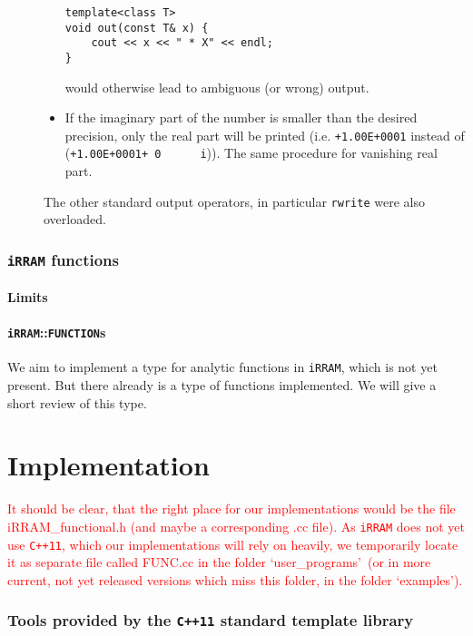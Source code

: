 \documentclass{article}
\newcommand{\irram}{\texttt{iRRAM}\xspace}
\newcommand{\ccOx}{\texttt{C++11}\xspace}
\newcommand{\ir}[1]{\texttt{#1}}
\newcommand{\code}[1]{\texttt{#1}}
\newcommand{\temp}[1]{\textcolor{red}{#1}}
\begin{document}
\begin{description}
\begin{itemize}
\begin{lstlisting}
template<class T>
void out(const T& x) {
	cout << x << " * X" << endl;
}
\end{lstlisting}
would otherwise lead to ambiguous (or wrong) output.
\item If the imaginary part of the number is smaller than the desired precision, only the real part will be printed (i.e. \code{+1.00E+0001} instead of (\code{+1.00E+0001+ 0 \ \ \ \ \  i})). The same procedure for vanishing real part.
\end{itemize}
The other standard output operators, in particular \ir{rwrite} were also overloaded.
\end{description}

\section{\irram functions}

\subsection{Limits}

\subsection{\irram::\ir{FUNCTION}s}

We aim to implement a type for analytic functions in \irram, which is not yet present. But there already is a type of functions implemented. We will give a short review of this type.

\part{Implementation}

\temp{It should be clear, that the right place for our implementations would be the file iRRAM\_functional.h (and maybe a corresponding .cc file). As \irram does not yet use \ccOx, which our implementations will rely on heavily, we temporarily locate it as separate file called FUNC.cc in the folder \lq user\_programs\rq\ (or in more current, not yet released versions which miss this folder, in the folder \lq examples\rq).}

\section{Tools provided by the \ccOx standard template library}
\end{document}
